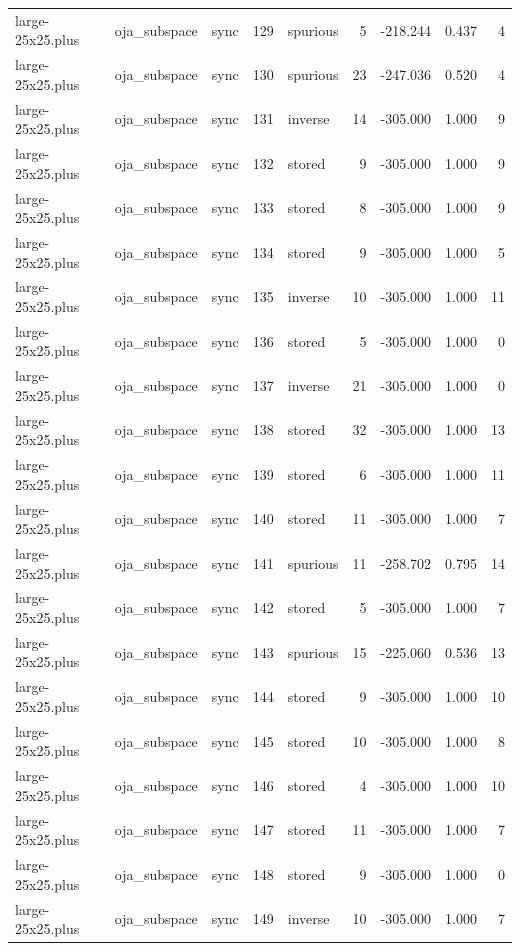 \begin{tabular}{lllrlrrrr}
large-25x25.plus & oja\_subspace & sync & 129 & spurious & 5 & -218.244 & 0.437 & 4 \\
large-25x25.plus & oja\_subspace & sync & 130 & spurious & 23 & -247.036 & 0.520 & 4 \\
large-25x25.plus & oja\_subspace & sync & 131 & inverse & 14 & -305.000 & 1.000 & 9 \\
large-25x25.plus & oja\_subspace & sync & 132 & stored & 9 & -305.000 & 1.000 & 9 \\
large-25x25.plus & oja\_subspace & sync & 133 & stored & 8 & -305.000 & 1.000 & 9 \\
large-25x25.plus & oja\_subspace & sync & 134 & stored & 9 & -305.000 & 1.000 & 5 \\
large-25x25.plus & oja\_subspace & sync & 135 & inverse & 10 & -305.000 & 1.000 & 11 \\
large-25x25.plus & oja\_subspace & sync & 136 & stored & 5 & -305.000 & 1.000 & 0 \\
large-25x25.plus & oja\_subspace & sync & 137 & inverse & 21 & -305.000 & 1.000 & 0 \\
large-25x25.plus & oja\_subspace & sync & 138 & stored & 32 & -305.000 & 1.000 & 13 \\
large-25x25.plus & oja\_subspace & sync & 139 & stored & 6 & -305.000 & 1.000 & 11 \\
large-25x25.plus & oja\_subspace & sync & 140 & stored & 11 & -305.000 & 1.000 & 7 \\
large-25x25.plus & oja\_subspace & sync & 141 & spurious & 11 & -258.702 & 0.795 & 14 \\
large-25x25.plus & oja\_subspace & sync & 142 & stored & 5 & -305.000 & 1.000 & 7 \\
large-25x25.plus & oja\_subspace & sync & 143 & spurious & 15 & -225.060 & 0.536 & 13 \\
large-25x25.plus & oja\_subspace & sync & 144 & stored & 9 & -305.000 & 1.000 & 10 \\
large-25x25.plus & oja\_subspace & sync & 145 & stored & 10 & -305.000 & 1.000 & 8 \\
large-25x25.plus & oja\_subspace & sync & 146 & stored & 4 & -305.000 & 1.000 & 10 \\
large-25x25.plus & oja\_subspace & sync & 147 & stored & 11 & -305.000 & 1.000 & 7 \\
large-25x25.plus & oja\_subspace & sync & 148 & stored & 9 & -305.000 & 1.000 & 0 \\
large-25x25.plus & oja\_subspace & sync & 149 & inverse & 10 & -305.000 & 1.000 & 7 \\

\end{tabular}
